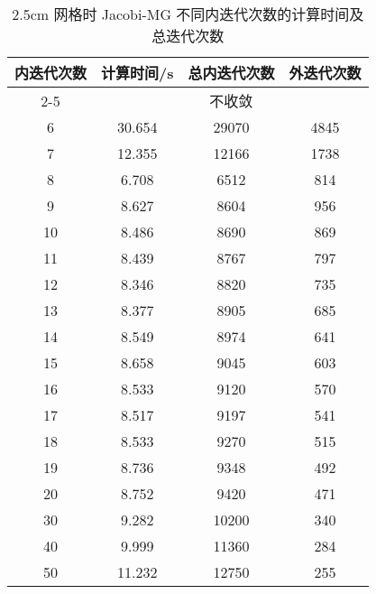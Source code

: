 \begin{datasheet}
\begin{table}
\centering
\caption{2.5cm 网格时 Jacobi-MG 不同内迭代次数的计算时间及总迭代次数}
\label{tab:equsolve.iter.jacobi-mg.2.5cm}
\begin{tabular}{cccc}
\toprule
内迭代次数 & 计算时间/s & 总内迭代次数 & 外迭代次数\\
\midrule
2-5 & \multicolumn{3}{c}{不收敛} \\ %
6 & 30.654 & 29070 & 4845\\
7 & 12.355 & 12166 & 1738\\
8 & 6.708 & 6512 & 814\\
9 & 8.627 & 8604 & 956\\
10 & 8.486 & 8690 & 869\\
11 & 8.439 & 8767 & 797\\
12 & 8.346 & 8820 & 735\\
13 & 8.377 & 8905 & 685\\
14 & 8.549 & 8974 & 641\\
15 & 8.658 & 9045 & 603\\
16 & 8.533 & 9120 & 570\\
17 & 8.517 & 9197 & 541\\
18 & 8.533 & 9270 & 515\\
19 & 8.736 & 9348 & 492\\
20 & 8.752 & 9420 & 471\\
30 & 9.282 & 10200 & 340\\
40 & 9.999 & 11360 & 284\\
50 & 11.232 & 12750 & 255\\
\bottomrule
\end{tabular}
\end{table}


\end{datasheet}
